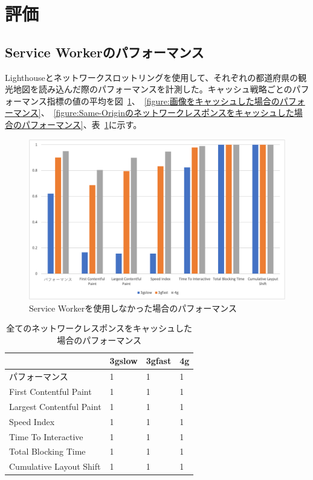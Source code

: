 \section{評価}
\label{section:評価}
\subsection{Service Workerのパフォーマンス}
\label{subsection:Service Workerのパフォーマンス}
Lighthouseとネットワークスロットリングを使用して、それぞれの都道府県の観光地図を読み込んだ際のパフォーマンスを計測した。キャッシュ戦略ごとのパフォーマンス指標の値の平均を図~\ref{figure:Service Workerを使用しなかった場合のパフォーマンス}、~\ref{figure:画像をキャッシュした場合のパフォーマンス}、~\ref{figure:Same-Originのネットワークレスポンスをキャッシュした場合のパフォーマンス}、表~\ref{table:全てのネットワークレスポンスをキャッシュした場合のパフォーマンス}に示す。
\begin{figure}
  \centering
  \includegraphics[width=\textwidth]{images/without_service_worker.png}
  \caption{Service Workerを使用しなかった場合のパフォーマンス}\label{figure:Service Workerを使用しなかった場合のパフォーマンス}
\end{figure}
\begin{table}
  \caption{全てのネットワークレスポンスをキャッシュした場合のパフォーマンス}
  \label{table:全てのネットワークレスポンスをキャッシュした場合のパフォーマンス}
  \centering
  \begin{tabular}{|p{15em}|p{5em}|p{5em}|p{5em}|}
    \hline
    & 3gslow & 3gfast & 4g \\ \hline
    パフォーマンス & 1 & 1 & 1 \\ \hline
    First Contentful Paint & 1 & 1 & 1 \\ \hline
    Largest Contentful Paint & 1 & 1 & 1 \\ \hline
    Speed Index & 1 & 1 & 1 \\ \hline
    Time To Interactive & 1 & 1 & 1 \\ \hline
    Total Blocking Time & 1 & 1 & 1 \\ \hline
    Cumulative Layout Shift & 1 & 1 & 1 \\ \hline
  \end{tabular}
\end{table}
